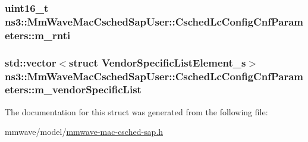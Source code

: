 \subsubsection[{\texorpdfstring{m\+\_\+rnti}{m_rnti}}]{\setlength{\rightskip}{0pt plus 5cm}uint16\+\_\+t ns3\+::\+Mm\+Wave\+Mac\+Csched\+Sap\+User\+::\+Csched\+Lc\+Config\+Cnf\+Parameters\+::m\+\_\+rnti}\hypertarget{structns3_1_1MmWaveMacCschedSapUser_1_1CschedLcConfigCnfParameters_a361cbea55573c769795ea10a1e16385c}{}\label{structns3_1_1MmWaveMacCschedSapUser_1_1CschedLcConfigCnfParameters_a361cbea55573c769795ea10a1e16385c}
\subsubsection[{\texorpdfstring{m\+\_\+vendor\+Specific\+List}{m_vendorSpecificList}}]{\setlength{\rightskip}{0pt plus 5cm}std\+::vector$<$struct {\bf Vendor\+Specific\+List\+Element\+\_\+s}$>$ ns3\+::\+Mm\+Wave\+Mac\+Csched\+Sap\+User\+::\+Csched\+Lc\+Config\+Cnf\+Parameters\+::m\+\_\+vendor\+Specific\+List}\hypertarget{structns3_1_1MmWaveMacCschedSapUser_1_1CschedLcConfigCnfParameters_ac4a1305bb35800b860a2658143918d3b}{}\label{structns3_1_1MmWaveMacCschedSapUser_1_1CschedLcConfigCnfParameters_ac4a1305bb35800b860a2658143918d3b}


The documentation for this struct was generated from the following file\+:\begin{DoxyCompactItemize}
\item 
mmwave/model/\hyperlink{mmwave-mac-csched-sap_8h}{mmwave-\/mac-\/csched-\/sap.\+h}\end{DoxyCompactItemize}
